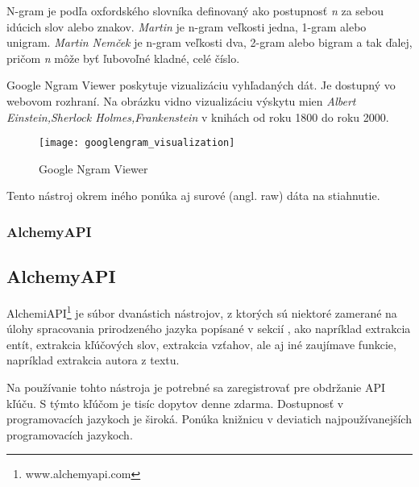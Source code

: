N-gram je podľa oxfordského slovníka definovaný ako postupnosť \textit{n} za sebou idúcich slov alebo znakov. \textit{Martin} je n-gram veľkosti jedna, 1-gram alebo unigram. \textit{Martin Nemček} je n-gram veľkosti dva, 2-gram alebo bigram a tak ďalej, pričom \textit{n} môže byť ľubovoľné kladné, celé číslo.

Google Ngram Viewer poskytuje vizualizáciu vyhľadaných dát. Je dostupný vo webovom rozhraní. Na obrázku  vidno vizualizáciu výskytu mien \textit{Albert Einstein,Sherlock Holmes,Frankenstein} v knihách od roku 1800 do roku 2000.

\begin{figure}[H]
\begin{center}\texttt{[image: googlengram\_visualization]}\end{center}
\caption[Google Ngram Viewer]{Google Ngram Viewer}\label{fig:googlengram_visualization}
\end{figure}

Tento nástroj okrem iného ponúka aj surové (angl. raw) dáta na stiahnutie.

%
%
{
	\subsubsection{AlchemyAPI}
}
{
	\subsection{AlchemyAPI}
}
\label{subsubsec:alchemyapi}
AlchemiAPI\footnote{www.alchemyapi.com} je súbor dvanástich nástrojov, z ktorých sú niektoré zamerané na úlohy spracovania prirodzeného jazyka popísané v sekcií , ako napríklad extrakcia entít, extrakcia kľúčových slov, extrakcia vzťahov, ale aj iné zaujímave funkcie, napríklad extrakcia autora z textu.

Na používanie tohto nástroja je potrebné sa zaregistrovať pre obdržanie API kľúču. S týmto kľúčom je tisíc dopytov denne zdarma. Dostupnosť v programovacích jazykoch je široká. Ponúka knižnicu v deviatich najpoužívanejších programovacích jazykoch.

